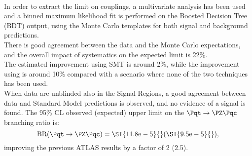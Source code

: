 \vspace{\baselineskip}
\\In order to extract the limit on \tZc couplings, a multivariate analysis has been used and a binned maximum likelihood fit is performed on the Boosted Decision Tree (BDT) output, using the Monte Carlo templates for both signal and background predictions.\\
There is good agreement between the data and the Monte Carlo expectations, 
and the overall impact of systematics on the expected limit is 22\%.\\
The estimated improvement using SMT is around 2\%, while the improvement using \DLrc is around 10\% compared with a scenario where none of the two techniques has been used.
\vspace{\baselineskip}
\\When data are unblinded also in the Signal Regions, a good agreement between data and Standard Model predictions is observed, and no evidence of a signal is found. The 95\% CL observed (expected) upper limit on the $\Pqt\rightarrow\PZ\Pqc$ branching ratio is:
\begin{equation*}
\mathrm{BR (\Pqt\rightarrow\PZ\Pqc)=\SI{11.8e-5}{}(\SI{9.5e-5}{})},
\end{equation*}
improving the previous ATLAS results by a factor of 2 (2.5).

